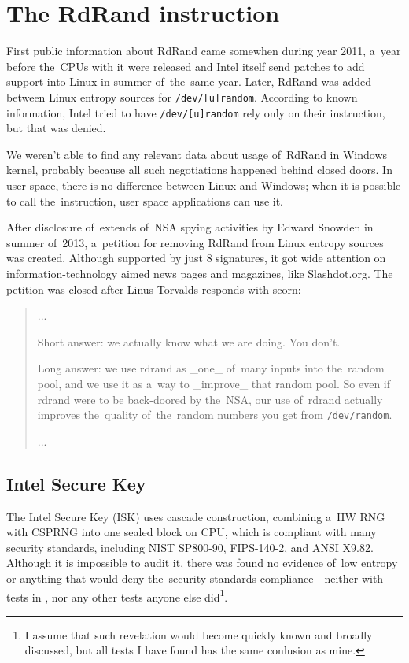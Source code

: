 \chapter{The RdRand instruction}  \label{chap:rdrand-instruction}
First public information about RdRand came somewhen during year 2011\cite{IntelRdRandFindAbout}, a~year before the~CPUs with it were released and Intel itself send patches to add support into Linux in summer of~the~same year\cite{KernelRdRand}. Later, RdRand was added between Linux entropy sources for {\tt /dev/[u]random}.%
According to known information\cite{TheodoreTsoNSA}, Intel tried to have {\tt /dev/[u]random} rely only on their instruction, but that was denied. 

We weren't able to find any relevant data about usage of~RdRand in Windows kernel, probably because all such negotiations happened behind closed doors. In user space, there is no difference between Linux and Windows; when it is possible to call the~instruction, user space applications can use it. 

After disclosure of~extends of~NSA spying activities by Edward Snowden in summer of~2013\cite{GuardianNSA}\cite{DailymailNSA}, a~petition for removing RdRand from Linux entropy sources was created\cite{PetitionRdRand}. Although supported by just 8 signatures, it got wide attention on information-technology aimed news pages and magazines, like Slashdot.org\cite{PetitionRdRandSlashdot}. The petition was closed after Linus Torvalds responds with scorn:

\begin{quote} ...

Short answer: we actually know what we are doing. You don't.

Long answer: we use rdrand as \_one\_ of~many inputs into the~random pool, and we use it as a~way to \_improve\_ that random pool. So even if rdrand were to be back-doored by the~NSA, our use of~rdrand actually improves the~quality of~the~random numbers you get from {\tt /dev/random}.

...
\end{quote}


\section{Intel Secure Key}\label{sec:intel-secure-key}
The Intel Secure Key (ISK) uses cascade construction, combining a~HW RNG with CSPRNG into one sealed block on CPU, which is compliant with many security standards, including NIST SP800-90, FIPS-140-2, and ANSI X9.82\cite{IntelDRNGGuide}. Although it is impossible to audit it, there was found no evidence of~low entropy or anything that would deny the~security standards compliance - neither with tests in , nor any other tests anyone else did\footnote{I assume that such revelation would become quickly known and broadly discussed, but all tests I have found has the same conlusion as mine.}.

